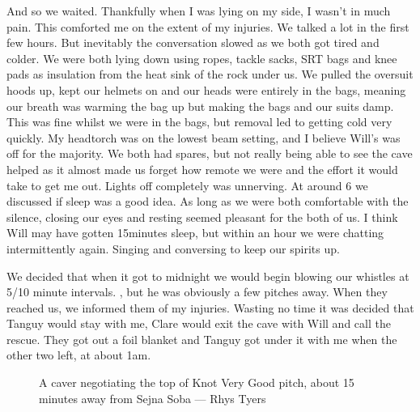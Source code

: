     And so we waited. Thankfully when I was lying on my side, I wasn’t in much pain. This comforted me on the extent of my injuries. We talked a lot in the first few hours. But inevitably the conversation slowed as we both got tired and colder. We were both lying down using ropes, tackle sacks, SRT bags and knee pads as insulation from the heat sink of the rock under us. We pulled the oversuit hoods up, kept our helmets on and our heads were entirely in the bags, meaning our breath was warming the bag up but making the bags and our suits damp. This was fine whilst we were in the bags, but removal led to getting cold very quickly. My headtorch was on the lowest beam setting, and I believe Will’s was off for the majority. We both had spares, but not really being able to see the cave helped as it almost made us forget how remote we were and the effort it would take to get me out. Lights off completely was unnerving. At around 6 we discussed if sleep was a good idea. As long as we were both comfortable with the silence, closing our eyes and resting seemed pleasant for the both of us. I think Will may have gotten 15minutes sleep, but within an hour we were chatting intermittently again. Singing and conversing to keep our spirits up.

    We decided that when it got to midnight we would begin blowing our whistles at 5/10 minute intervals. , but he was obviously a few pitches away. When they reached us, we informed them of my injuries. Wasting no time it was decided that Tanguy would stay with me, Clare would exit the cave with Will and call the rescue. They got out a foil blanket and Tanguy got under it with me when the other two left, at about 1am.

    \begin{figure}[t]
        \checkoddpage \ifoddpage \forcerectofloat \else \forceversofloat \fi
        \centering
        \caption{A caver negotiating the top of Knot Very Good pitch, about 15 minutes away from Sejna Soba --- Rhys Tyers}
        \label{KnotVeryGood}
    \end{figure}

